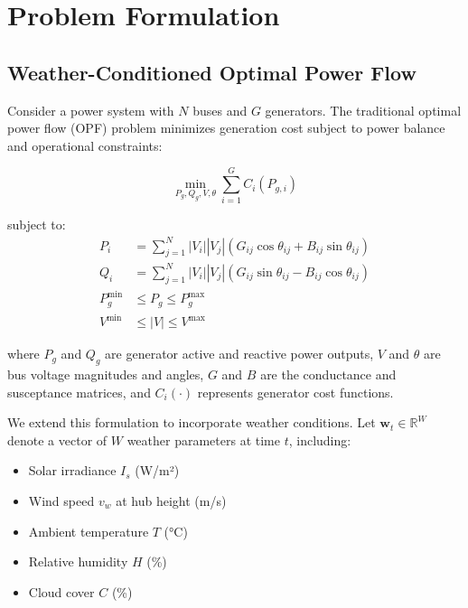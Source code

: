 \documentclass[journal,12pt,onecolumn]{IEEEtran}
\begin{document}
\section{Problem Formulation}
\label{sec:problem}

\subsection{Weather-Conditioned Optimal Power Flow}

Consider a power system with $N$ buses and $G$ generators. The traditional optimal power flow (OPF) problem minimizes generation cost subject to power balance and operational constraints:

\begin{equation}
\min_{P_g, Q_g, V, \theta} \sum_{i=1}^{G} C_i(P_{g,i})
\label{eq:opf_objective}
\end{equation}

subject to:
\begin{align}
P_i &= \sum_{j=1}^{N} |V_i||V_j|(G_{ij}\cos\theta_{ij} + B_{ij}\sin\theta_{ij}) \label{eq:power_balance_p} \\
Q_i &= \sum_{j=1}^{N} |V_i||V_j|(G_{ij}\sin\theta_{ij} - B_{ij}\cos\theta_{ij}) \label{eq:power_balance_q} \\
P_g^{\min} &\leq P_g \leq P_g^{\max} \label{eq:gen_limits} \\
V^{\min} &\leq |V| \leq V^{\max} \label{eq:voltage_limits}
\end{align}

where $P_g$ and $Q_g$ are generator active and reactive power outputs, $V$ and $\theta$ are bus voltage magnitudes and angles, $G$ and $B$ are the conductance and susceptance matrices, and $C_i(\cdot)$ represents generator cost functions.

We extend this formulation to incorporate weather conditions. Let $\mathbf{w}_t \in \mathbb{R}^{W}$ denote a vector of $W$ weather parameters at time $t$, including:

\begin{itemize}
    \item Solar irradiance $I_s$ (W/m²)
    \item Wind speed $v_w$ at hub height (m/s)
    \item Ambient temperature $T$ (°C)
    \item Relative humidity $H$ (\%)
    \item Cloud cover $C$ (\%)
\end{itemize}
\end{document}

